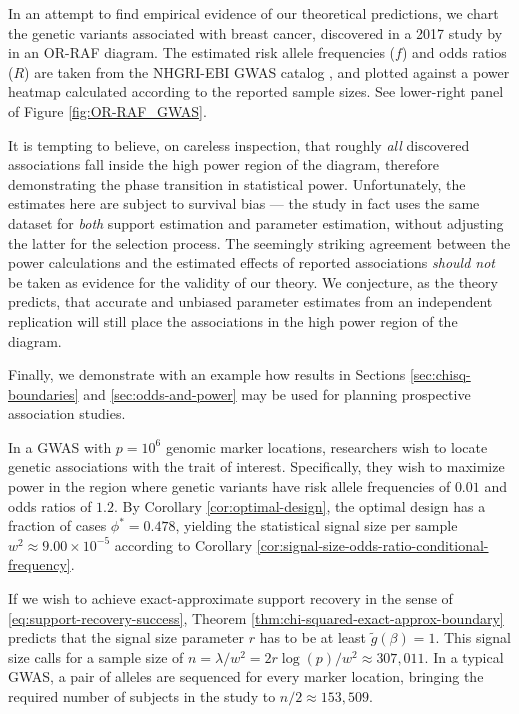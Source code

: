 \begin{remark}
\label{rmk:OR-RAF_false_evidence}
In an attempt to find empirical evidence of our theoretical predictions, we chart the genetic variants associated with breast cancer, discovered in a 2017 study by \citet{michailidou2017association} in an OR-RAF diagram. 
The estimated risk allele frequencies ($f$) and odds ratios ($R$) are taken from the NHGRI-EBI GWAS catalog \cite{macarthur2016new}, and plotted against a power heatmap calculated according to the reported sample sizes. 
See lower-right panel of Figure \ref{fig:OR-RAF_GWAS}.

It is tempting to believe, on careless inspection, that roughly \emph{all} discovered associations fall inside the high power region of the diagram, therefore demonstrating the phase transition in statistical power.
Unfortunately, the estimates here are subject to survival {bias} --- the study in fact uses the {same} dataset for \emph{both} support estimation and parameter estimation, without adjusting the latter for the selection process.
The seemingly striking agreement between the power calculations and the estimated effects of reported associations \emph{should not} be taken as evidence for the validity of our theory.
We conjecture, as the theory predicts, that accurate and unbiased parameter estimates from an independent replication will still place the associations in the high power region of the diagram. 
\end{remark}

Finally, we demonstrate with an example how results in Sections \ref{sec:chisq-boundaries} and \ref{sec:odds-and-power} may be used for planning prospective association studies.

\begin{example}
In a GWAS with $p = 10^6$ genomic marker locations, researchers wish to locate genetic associations with the trait of interest.
Specifically, they wish to maximize power in the region where genetic variants have risk allele frequencies of $0.01$ and odds ratios of $1.2$.
By Corollary \ref{cor:optimal-design}, the optimal design has a fraction of cases $\phi^* = 0.478$, yielding the statistical signal size per sample $w^2\approx9.00\times10^{-5}$ according to Corollary \ref{cor:signal-size-odds-ratio-conditional-frequency}.

If we wish to achieve exact-approximate support recovery in the sense of \eqref{eq:support-recovery-success}, Theorem \ref{thm:chi-squared-exact-approx-boundary} predicts that the signal size parameter $r$ has to be at least $\widetilde{g}(\beta)= 1$.
This signal size calls for a sample size of $n = \lambda / w^2 = 2r\log(p)/w^2 \approx 307,011$.
In a typical GWAS, a pair of alleles are sequenced for every marker location, bringing the required number of subjects in the study to $n/2 \approx 153,509$.
\end{example}

